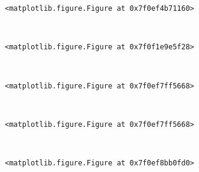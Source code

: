 \documentclass[11pt]{article}
\begin{document}
    
    \begin{verbatim}
<matplotlib.figure.Figure at 0x7f0ef4b71160>
    \end{verbatim}

    
    \begin{center}
    \end{center}
    { \hspace*{\fill} \\}
    
    
    \begin{verbatim}
<matplotlib.figure.Figure at 0x7f0f1e9e5f28>
    \end{verbatim}

    
    \begin{center}
    \end{center}
    { \hspace*{\fill} \\}
    
    
    \begin{verbatim}
<matplotlib.figure.Figure at 0x7f0ef7ff5668>
    \end{verbatim}

    
    \begin{center}
    \end{center}
    { \hspace*{\fill} \\}
    
    
    \begin{verbatim}
<matplotlib.figure.Figure at 0x7f0ef7ff5668>
    \end{verbatim}

    
    \begin{center}
    \end{center}
    { \hspace*{\fill} \\}
    
    
    \begin{verbatim}
<matplotlib.figure.Figure at 0x7f0ef8bb0fd0>
    \end{verbatim}

    
    \begin{center}
    \end{center}
    { \hspace*{\fill} \\}
    
\end{document}
